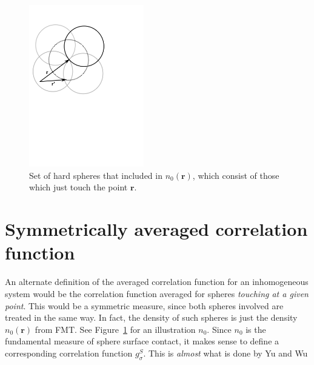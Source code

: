 \documentclass[letterpaper,twocolumn,amsmath,amssymb,jcp,10pt,aip]{revtex4-1}
\newcommand{\rr}{\textbf{r}}
\begin{document}
\begin{figure}
\includegraphics[width=5cm]{figs/n0}
\caption{Set of hard spheres that included in $n_0(\mathbf{r})$, which
  consist of those which just touch the point $\mathbf{r}$.}
\label{fig:n0}
\end{figure}

\section{Symmetrically averaged correlation function}\label{sec:g-S}

An alternate definition of the averaged correlation function for an
inhomogeneous system would be the correlation function averaged for
spheres \emph{touching at a given point}.  This would be a symmetric
measure, since both spheres involved are treated in the same way.  In
fact, the density of such spheres is just the density $n_0(\rr)$ from
FMT.  See Figure~\ref{fig:n0} for an illustration $n_0$.  Since $n_0$
is the fundamental measure of sphere surface contact, it makes sense
to define a corresponding correlation function $g_\sigma^S$.  This is
\emph{almost} what is done by Yu and  Wu
\end{document}
